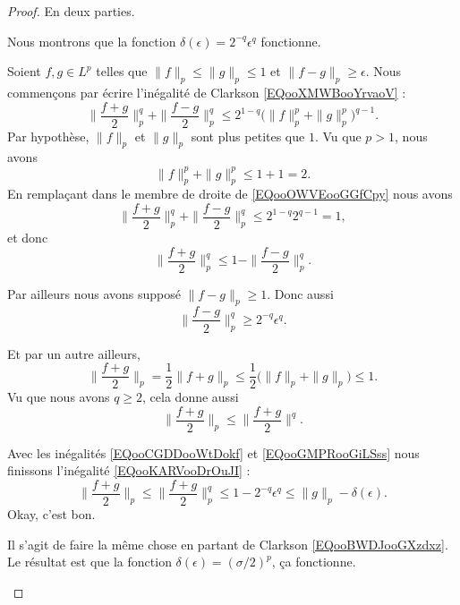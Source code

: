 	\begin{proof}
		En deux parties.

		\begin{subproof}
			\spitem[\( 1<p\leq 2\)]
			Nous montrons que la fonction \( \delta(\epsilon)=2^{-q}\epsilon^q\) fonctionne.

			Soient \( f,g\in L^p\) telles que \( \| f \|_p\leq \| g \|_p\leq 1\) et \( \| f-g \|_p\geq \epsilon\). Nous commençons par écrire l'inégalité de Clarkson \eqref{EQooXMWBooYrvaoV} :
			\begin{equation}        \label{EQooOWVEooGGfCpy}
				\| \frac{ f+g }{2} \|_p^q+\| \frac{ f-g }{2} \|_p^q\leq 2^{1-q}\big( \| f \|_p^p+\| g \|_p^p \big)^{q-1}.
			\end{equation}
			Par hypothèse, \( \| f \|_p\) et \( \| g \|_p\) sont plus petites que \( 1\). Vu que \( p>1\), nous avons
			\begin{equation}
				\| f \|_p^p+\| g \|_p^p\leq 1+1=2.
			\end{equation}
			En remplaçant dans le membre de droite de \eqref{EQooOWVEooGGfCpy} nous avons
			\begin{equation}
				\| \frac{ f+g }{2} \|_p^q+\| \frac{ f-g }{2} \|_p^q\leq 2^{1-q}2^{q-1}=1,
			\end{equation}
			et donc
			\begin{equation}        \label{EQooKARVooDrOuJI}
				\| \frac{ f+g }{2} \|_p^q\leq 1-\| \frac{ f-g }{2} \|_p^q.
			\end{equation}

			Par ailleurs nous avons supposé \( \| f-g \|_p\geq 1\). Donc aussi
			\begin{equation}        \label{EQooCGDDooWtDokf}
				\| \frac{ f-g }{2} \|_p^q\geq 2^{-q}\epsilon^q.
			\end{equation}

			Et par un autre ailleurs,
			\begin{equation}        \label{EQooOFWYooLVrNDc}
				\| \frac{ f+g }{2} \|_p=\frac{ 1 }{2}\| f+g \|_p\leq \frac{ 1 }{2}\big( \| f \|_p+\| g \|_p \big)\leq 1.
			\end{equation}
			Vu que nous avons \( q\geq 2\), cela donne aussi
			\begin{equation}        \label{EQooGMPRooGiLSss}
				\| \frac{ f+g }{2} \|_p\leq \| \frac{ f+g }{2} \|^q.
			\end{equation}

			Avec les inégalités \eqref{EQooCGDDooWtDokf} et \ref{EQooGMPRooGiLSss} nous finissons l'inégalité \eqref{EQooKARVooDrOuJI} :
			\begin{equation}
				\| \frac{ f+g }{2} \|_p\leq \| \frac{ f+g }{2} \|_p^q\leq 1-2^{-q}\epsilon^q\leq \| g \|_p-\delta(\epsilon).
			\end{equation}
			Okay, c'est bon.

			Il s'agit de faire la même chose en partant de Clarkson \eqref{EQooBWDJooGXzdxz}. Le résultat est que la fonction \( \delta(\epsilon)=(\sigma/2)^p\), ça fonctionne.
		\end{subproof}
	\end{proof}


